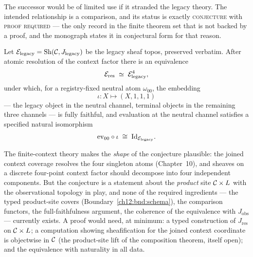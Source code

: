 The successor would be of limited use if it stranded the legacy theory. The
intended relationship is a comparison, and its status is exactly
\textsc{conjecture} with \textsc{proof required} --- the only record in the
finite theorem set that is not backed by a proof, and the monograph states
it in conjectural form for that reason.

\begin{conjecture}
\label{ch12:conj:roundtrip}
Let $\mathcal{E}_{\mathrm{legacy}} = \mathrm{Sh}(\mathcal{C}, J_{\mathrm{legacy}})$ be the legacy sheaf topos,
preserved verbatim. After atomic resolution of the context factor there is
an equivalence
\[
\mathcal{E}_{\mathrm{res}} \;\simeq\; \mathcal{E}_{\mathrm{legacy}}^{4},
\]
under which, for a registry-fixed neutral atom $\omega_{00}$, the embedding
\[
\iota : X \longmapsto (X, 1, 1, 1)
\]
--- the legacy object in the neutral channel, terminal objects in the
remaining three channels --- is fully faithful, and evaluation at the
neutral channel satisfies a specified natural isomorphism
\[
\mathrm{ev}_{00} \circ \iota \;\cong\; \mathrm{Id}_{\mathcal{E}_{\mathrm{legacy}}}.
\]
\end{conjecture}

\begin{remark}
\label{ch12:rem:whyplausible}
The finite-context theory makes the \emph{shape} of the conjecture
plausible: the joined context coverage resolves the four singleton atoms
(Chapter~10), and sheaves on a discrete four-point context factor should
decompose into four independent components. But the conjecture is a
statement about the \emph{product} site $\mathcal{C} \times L$ with the
observational topology in play, and none of the required ingredients ---
the typed product-site covers (Boundary~\ref{ch12:bnd:schema}), the
comparison functors, the full-faithfulness argument, the coherence of the
equivalence with $J_{\mathrm{obs}}$ --- currently exists. A proof would
need, at minimum: a typed construction of $J_{\mathrm{res}}$ on
$\mathcal{C} \times L$; a computation showing sheafification for the joined context
coordinate is objectwise in $\mathcal{C}$ (the product-site lift of the composition
theorem, itself open); and the equivalence with naturality in all data.
\end{remark}

